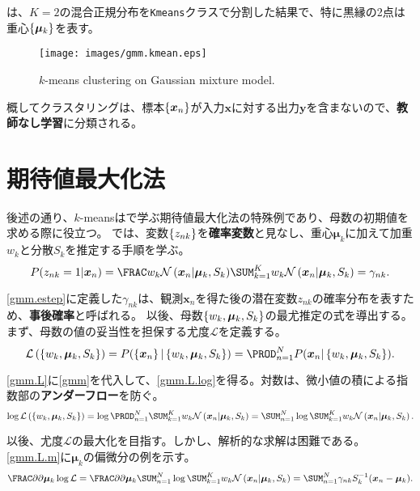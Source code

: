 \documentclass[10pt,a4paper]{book}
\begin{document}
は、$K\!=\!2$の混合正規分布を\texttt{Kmeans}クラスで分割した結果で、特に黒縁の2点は重心$\seq{\bm{\mu}_k}$を表す。

\begin{figure}[h]
\centering
\texttt{[image: images/gmm.kmean.eps]}
\caption{$k$-means clustering on Gaussian mixture model.\label{fig:gmm.kmean}}
\end{figure}

概してクラスタリングは、標本$\seq{\bm{x}_n}$が入力$\bm{x}$に対する出力$\bm{y}$を含まないので、\textbf{教師なし学習}に分類される。

\section{期待値最大化法\label{sect:gmm.em}}

後述の通り、$k$-meansはで学ぶ期待値最大化法の特殊例であり、母数の初期値を求める際に役立つ。
では、変数$\seq{z_{nk}}$を\textbf{確率変数}と見なし、重心$\bm{\mu}_k$に加えて加重$w_k$と分散$S_k$を推定する手順を学ぶ。
%
\begin{equation}
\label{eq:gmm.estep}
P(z_{nk}=1|\bm{x}_n) = \normal{k=1}{K}{w_k \Nd{\bm{x}_n|\bm{\mu}_k,S_k}} = \gamma_{nk}.
\end{equation}

\eqref{gmm.estep}に定義した$\gamma_{nk}$は、観測$\bm{x}_n$を得た後の潜在変数$z_{nk}$の確率分布を表すため、\textbf{事後確率}と呼ばれる。
以後、母数$\seq{w_k,\bm{\mu}_k,S_k}$の最尤推定の式を導出する。まず、母数の値の妥当性を担保する尤度$\mathcal{L}$を定義する。
%
\begin{equation}
\label{eq:gmm.L}
\Lk{\seq{w_k,\bm{\mu}_k,S_k}} = P(\seq{\bm{x}_n}|\seq{w_k,\bm{\mu}_k,S_k}) = \prod_{n=1}^N P(\bm{x}_n|\seq{w_k,\bm{\mu}_k,S_k}).
\end{equation}

\eqref{gmm.L}に\eqref{gmm}を代入して、\eqref{gmm.L.log}を得る。対数は、微小値の積による指数部の\textbf{アンダーフロー}を防ぐ。
%
\begin{equation}
\label{eq:gmm.L.log}
\log \Lk{\seq{w_k,\bm{\mu}_k,S_k}}
= \log\prod_{n=1}^N \sum_{k=1}^K w_k \Nd{\bm{x}_n|\bm{\mu}_k,S_k}
= \sum_{n=1}^N \log \sum_{k=1}^K w_k \Nd{\bm{x}_n|\bm{\mu}_k,S_k}.
\end{equation}

以後、尤度$\mathcal{L}$の最大化を目指す。しかし、解析的な求解は困難である。\eqref{gmm.L.m}に$\bm{\mu}_k$の偏微分の例を示す。
%
\begin{equation}
\label{eq:gmm.L.m}
\pdiff{}{\bm{\mu}_k}\log\mathcal{L} =
\pdiff{}{\bm{\mu}_k}\sum_{n=1}^N \log\sum_{k=1}^K w_k \Nd{\bm{x}_n|\bm{\mu}_k,S_k} =
\sum_{n=1}^N \gamma_{nk} S_k^{-1} (\bm{x}_n - \bm{\mu}_k).
\end{equation}
\end{document}
